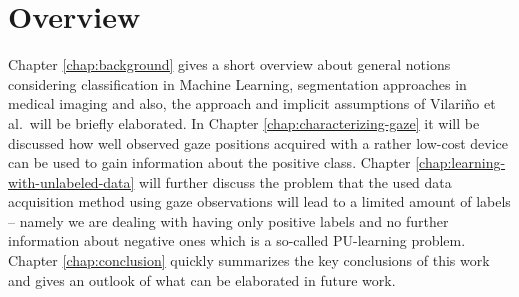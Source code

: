 \section{Overview}
Chapter \ref{chap:background} gives a short overview about general notions considering classification in Machine Learning, segmentation approaches in medical imaging and also, the approach and implicit assumptions of Vilari\~no et al.\ will be briefly elaborated. In Chapter \ref{chap:characterizing-gaze} it will be discussed how well observed gaze positions acquired with a rather low-cost device can be used to gain information about the positive class. Chapter \ref{chap:learning-with-unlabeled-data} will further discuss the problem that the used data acquisition method using gaze observations will lead to a limited amount of labels -- namely we are dealing with having only positive labels and no further information about negative ones which is a so-called PU-learning problem. 
Chapter \ref{chap:conclusion} quickly summarizes the key conclusions of this work and gives an outlook of what can be elaborated in future work.

